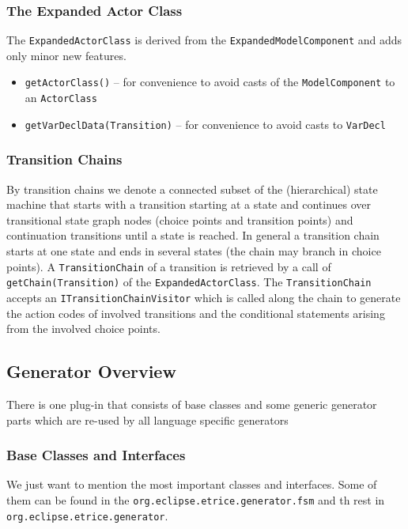 \subsubsection{The Expanded Actor Class}

The \texttt{ExpandedActorClass} is derived from the \texttt{ExpandedModelComponent} and adds only minor new features.
\begin{itemize}
\item \texttt{getActorClass()} -- for convenience to avoid casts of the \texttt{ModelComponent} to an \texttt{ActorClass} 
\item \texttt{getVarDeclData(Transition)} -- for convenience to avoid casts to \texttt{VarDecl}
\end{itemize}

\subsubsection{Transition Chains}

By transition chains we denote a connected subset of the (hierarchical) state machine that starts with a 
transition starting at a state and continues over transitional state graph nodes (choice points and 
transition points) and continuation transitions until a state is reached. In general a transition chain 
starts at one state and ends in several states (the chain may branch in choice points).
A \texttt{TransitionChain} of a transition is retrieved by a call of \texttt{getChain(Transition)} of the 
\texttt{ExpandedActorClass}.
The \texttt{TransitionChain} accepts an \texttt{ITransitionChainVisitor} which is called along the chain 
to generate the action codes of involved transitions and the conditional statements arising from the 
involved choice points. 

\subsection{Generator Overview}

There is one plug-in that consists of base classes and some generic generator parts which are re-used by 
all language specific generators
 
\subsubsection{Base Classes and Interfaces}

We just want to mention the most important classes and interfaces.
Some of them can be found in the \texttt{org.eclipse.etrice.generator.fsm} and th rest
in \texttt{org.eclipse.etrice.generator}.

